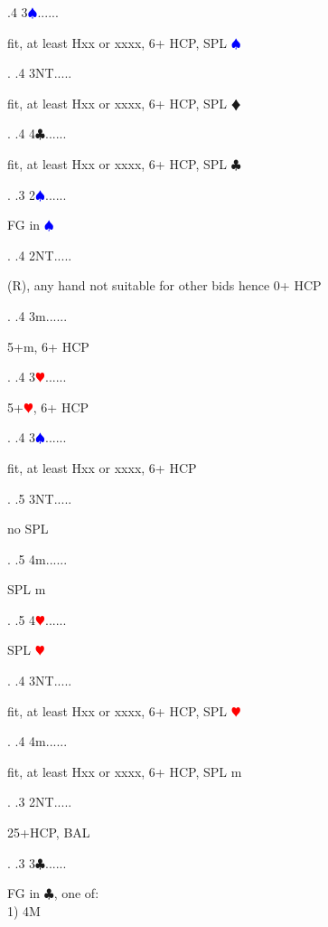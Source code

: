 \documentclass[a4paper]{article}
\newcommand{\BC}{\textcolor{OliveGreen}{$\clubsuit$}}
\newcommand{\BD}{\textcolor{RedOrange}{$\vardiamondsuit$}}
\newcommand{\BH}{\textcolor{Red}{$\varheartsuit${}}}
\newcommand{\BS}{\textcolor{Blue}{$\spadesuit${}}}
\begin{document}
{ .4 3\BS......\begin{minipage}[t]{0.8\textwidth}
fit, at least Hxx or xxxx, 6+ HCP, SPL \BS 
\end{minipage}. 
 .4 3NT.....\begin{minipage}[t]{0.8\textwidth}
fit, at least Hxx or xxxx, 6+ HCP, SPL \BD 
\end{minipage}. 
 .4 4\BC......\begin{minipage}[t]{0.8\textwidth}
fit, at least Hxx or xxxx, 6+ HCP, SPL \BC 
\end{minipage}. 
 .3 2\BS......\begin{minipage}[t]{0.8\textwidth}
FG in \BS 
\end{minipage}. 
 .4 2NT.....\begin{minipage}[t]{0.8\textwidth}
(R), any hand not suitable for other bids hence 0+ HCP
\end{minipage}. 
 .4 3m......\begin{minipage}[t]{0.8\textwidth}
5+m, 6+ HCP
\end{minipage}. 
 .4 3\BH......\begin{minipage}[t]{0.8\textwidth}
5+\BH , 6+ HCP
\end{minipage}. 
 .4 3\BS......\begin{minipage}[t]{0.8\textwidth}
fit, at least Hxx or xxxx, 6+ HCP
\end{minipage}. 
 .5 3NT.....\begin{minipage}[t]{0.8\textwidth}
no SPL
\end{minipage}. 
 .5 4m......\begin{minipage}[t]{0.8\textwidth}
SPL m
\end{minipage}. 
 .5 4\BH......\begin{minipage}[t]{0.8\textwidth}
SPL \BH 
\end{minipage}. 
 .4 3NT.....\begin{minipage}[t]{0.8\textwidth}
fit, at least Hxx or xxxx, 6+ HCP, SPL \BH 
\end{minipage}. 
 .4 4m......\begin{minipage}[t]{0.8\textwidth}
fit, at least Hxx or xxxx, 6+ HCP, SPL m
\end{minipage}. 
 .3 2NT.....\begin{minipage}[t]{0.8\textwidth}
25+HCP, BAL
\end{minipage}. 
 .3 3\BC......\begin{minipage}[t]{0.8\textwidth}
FG in \BC , one of:\\
1) 4M\\

\end{minipage}}
\end{document}

